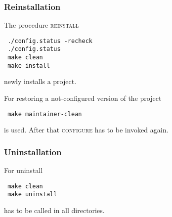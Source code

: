 \subsubsection{Reinstallation}
The procedure \textsc{reinstall}
\begin{verbatim}
 ./config.status -recheck
 ./config.status
 make clean
 make install
\end{verbatim}
newly installs a project.\par
For restoring a not-configured version of the project
\begin{verbatim}
 make maintainer-clean
\end{verbatim}
is used. After that \textsc{configure} has to be invoked again.

\subsubsection{Uninstallation}
For uninstall
\begin{verbatim}
 make clean
 make uninstall
\end{verbatim}
has to be called in all directories.

